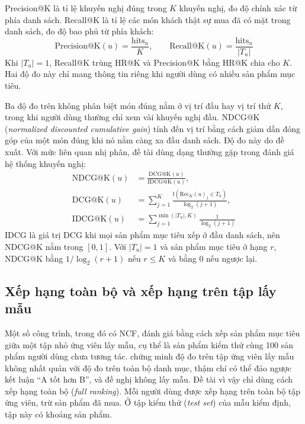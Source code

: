 Precision@K là tỉ lệ khuyến nghị đúng trong $K$ khuyến nghị, đo độ chính xác từ phía danh sách. Recall@K là tỉ lệ các món khách thật sự mua đã có mặt trong danh sách, đo độ bao phủ từ phía khách:
\begin{equation*}
    \text{Precision@K}(u) = \frac{\text{hits}_u}{K}, \qquad \text{Recall@K}(u) = \frac{\text{hits}_u}{|T_u|}
\end{equation*}
Khi $|T_u| = 1$, Recall@K trùng HR@K và Precision@K bằng HR@K chia cho $K$. Hai độ đo này chỉ mang thông tin riêng khi người dùng có nhiều sản phẩm mục tiêu.

Ba độ đo trên không phân biệt món đúng nằm ở vị trí đầu hay vị trí thứ $K$, trong khi người dùng thường chỉ xem vài khuyến nghị đầu. NDCG@K (\textit{normalized discounted cumulative gain}) tính đến vị trí bằng cách giảm dần đóng góp của một món đúng khi nó nằm càng xa đầu danh sách. Độ đo này do \textcite{jarvelin2002} đề xuất. Với mức liên quan nhị phân, đề tài dùng dạng thường gặp trong đánh giá hệ thống khuyến nghị:
\begin{equation*}
    \begin{aligned}
        \text{NDCG@K}(u) &= \frac{\text{DCG@K}(u)}{\text{IDCG@K}(u)}, \\
        \text{DCG@K}(u) &= \sum_{j=1}^{K} \frac{\mathbb{I}(\text{Rec}_K(u)_j \in T_u)}{\log_2(j + 1)}, \\
        \text{IDCG@K}(u) &= \sum_{j=1}^{\min(|T_u|, K)} \frac{1}{\log_2(j + 1)}
    \end{aligned}
\end{equation*}
IDCG là giá trị DCG khi mọi sản phẩm mục tiêu xếp ở đầu danh sách, nên NDCG@K nằm trong $[0, 1]$. Với $|T_u| = 1$ và sản phẩm mục tiêu ở hạng $r$, NDCG@K bằng $1/\log_2(r+1)$ nếu $r \le K$ và bằng 0 nếu ngược lại.

\subsection{Xếp hạng toàn bộ và xếp hạng trên tập lấy mẫu}

Một số công trình, trong đó có NCF, đánh giá bằng cách xếp sản phẩm mục tiêu giữa một tập nhỏ ứng viên lấy mẫu, cụ thể là sản phẩm kiểm thử cùng 100 sản phẩm người dùng chưa tương tác. \textcite{krichene2020sampled} chứng minh độ đo trên tập ứng viên lấy mẫu không nhất quán với độ đo trên toàn bộ danh mục, thậm chí có thể đảo ngược kết luận ``A tốt hơn B'', và đề nghị không lấy mẫu. Đề tài vì vậy chỉ dùng cách xếp hạng toàn bộ (\textit{full ranking}). Mỗi người dùng được xếp hạng trên toàn bộ tập ứng viên, trừ sản phẩm đã mua. Ở tập kiểm thử (\textit{test set}) của mẫu kiểm định, tập này có khoảng  sản phẩm.


